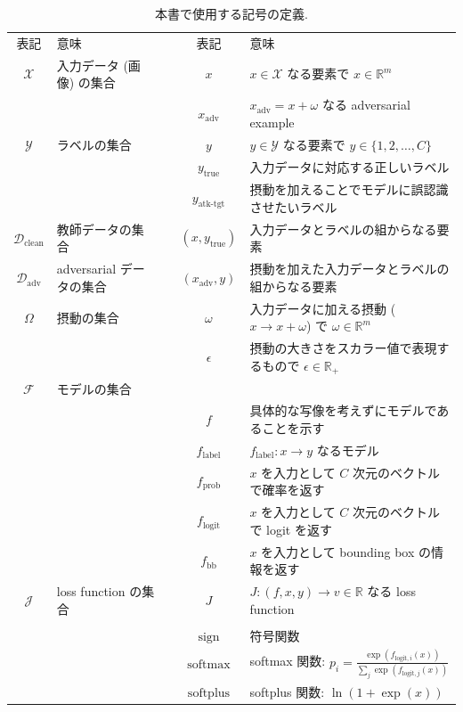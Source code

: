 \begin{table}[htbp]
\begin{center}
\begin{tabular}{clccl}
\hline
表記  & 意味 & & 表記  & 意味 \\
\cline{1-2}
\cline{4-5}
$\mathcal{X}$ & 入力データ (画像) の集合 & & $x$ & $x \in \mathcal{X}$ なる要素で $x \in \mathbb{R}^m$ \\
& & & $x_{\text{adv}}$ & $x_{\text{adv}} = x + \omega$ なる adversarial example \\
$\mathcal{Y}$ & ラベルの集合 & & $y$ & $y \in \mathcal{Y}$ なる要素で $y \in \{1, 2, \dots, C\}$ \\
& & & $y_{\text{true}}$ & 入力データに対応する正しいラベル \\
& & & $y_{\text{atk-tgt}}$ & 摂動を加えることでモデルに誤認識させたいラベル \\
$\mathcal{D}_{\text{clean}}$ & 教師データの集合 & & $(x,y_{\text{true}})$ & 入力データとラベルの組からなる要素 \\
$\mathcal{D}_{\text{adv}}$ & adversarial データの集合 & & $(x_{\text{adv}},y)$ & 摂動を加えた入力データとラベルの組からなる要素 \\
$\Omega$ & 摂動の集合 & & $\omega$ & 入力データに加える摂動 ($x \rightarrow x + \omega$) で $\omega \in \mathbb{R}^m$ \\
& & & $\epsilon$ & 摂動の大きさをスカラー値で表現するもので $\epsilon \in \mathbb{R}_{+}$ \\
$\mathcal{F}$ & モデルの集合 & & & \\
& & & $f$ & 具体的な写像を考えずにモデルであることを示す \\
& & & $f_{\text{label}}$ & $f_{\text{label}}: x \rightarrow y$ なるモデル \\
& & & $f_{\text{prob}}$ & $x$ を入力として $C$ 次元のベクトルで確率を返す \\
& & & $f_{\text{logit}}$ & $x$ を入力として $C$ 次元のベクトルで logit を返す \\
& & & $f_{\text{bb}}$ & $x$ を入力として bounding box の情報を返す \\
$\mathcal{J}$ & loss function の集合 & & $J$ & $J: (f, x, y) \rightarrow v \in \mathbb{R}$ なる loss function  \\
& & & \\
& & & $\text{sign}$ & 符号関数 \\
& & & $\text{softmax}$ & softmax 関数: $p_i = \frac{\exp (f_{\text{logit}, i} (x))}{\sum_j \exp (f_{\text{logit}, j} (x))}$ \\
& & & $\text{softplus}$ & softplus 関数: $\ln (1 + \exp (x))$ \\
\hline
\end{tabular}
\caption{本書で使用する記号の定義. \label{tb:notation}}
\end{center}
\end{table}
%




